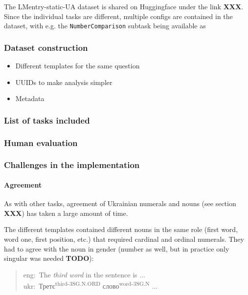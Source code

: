 The LMentry-static-UA dataset is shared on Huggingface under the link
\textbf{XXX}. Since the individual tasks are different, multiple configs
are contained in the dataset, with e.g. the \texttt{NumberComparison}
subtask being available as 

\subsubsection{Dataset construction}\label{dataset-construction}

\begin{itemize}
\tightlist
\item
  Different templates for the same question
\item
  UUIDs to make analysis simpler
\item
  Metadata
\end{itemize}

\subsubsection{List of tasks included}\label{list-of-tasks-included}

\subsubsection{Human evaluation}\label{human-evaluation}

\subsubsection{Challenges in the
implementation}\label{challenges-in-the-implementation}

\paragraph{Agreement}\label{agreement}

As with other tasks, agreement of Ukrainian numerals and nouns (see
section \textbf{XXX}) has taken a large amount of time.

The different templates contained different nouns in the same role
(first word, word one, first position, etc.) that required cardinal and
ordinal numerals. They had to agree with the noun in gender (number as
well, but in practice only singular was needed \textbf{TODO}):

\begin{quote}
eng: The \emph{third} \emph{word} in the sentence is ...\\
ukr: Третє\textsuperscript{third-3SG.N.ORD} слово\textsuperscript{word-3SG.N} ...
\end{quote}

